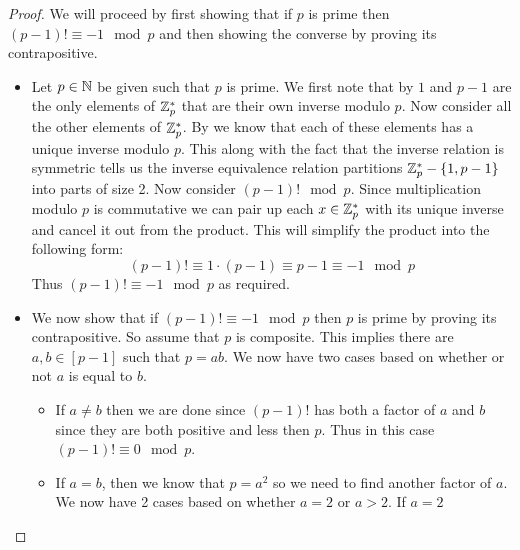         \begin{proof}
            We will proceed by first showing that if $p$ is prime then $(p - 1)! \equiv -1 \mod p$ and then
            showing the converse by proving its contrapositive.

            \begin{itemize}
                \item
                    Let $p \in \mathbb{N}$ be given such that $p$ is prime. 
                    We first note that by  $1$ and $p - 1$ are the
                    only elements of $\mathbb{Z}_{p}^{*}$ that are their own inverse modulo $p$. Now consider
                    all the other elements of $\mathbb{Z}_{p}^{*}$. By  we know
                    that each of these elements has a unique inverse modulo $p$. This along with the fact
                    that the inverse relation is symmetric tells us the inverse equivalence relation
                    partitions $\mathbb{Z}_{p}^{*} - \left\{1, p - 1\right\}$ into parts of size 2. Now consider
                    $(p - 1)! \mod p$. Since multiplication modulo $p$ is commutative we can pair up each
                    $x \in \mathbb{Z}_{p}^{*}$ with its unique inverse and cancel it out from the product. This
                    will simplify the product into the following form:
                    \[
                        (p - 1)! \equiv 1 \cdot (p - 1) \equiv p - 1 \equiv -1 \mod p
                    \]
                    Thus $(p - 1)! \equiv -1 \mod p$ as required.
                \item
                    We now show that if $(p - 1)! \equiv -1 \mod p$ then $p$ is prime by proving
                    its contrapositive. So assume that $p$ is composite. This implies there are
                    $a, b \in [p - 1]$ such that $p = ab$. We now have two cases based on whether
                    or not $a$ is equal to $b$.
                    \begin{itemize}
                        \item
                            If $a \neq b$ then we are done since $(p - 1)!$ has both a factor of $a$
                            and $b$ since they are both positive and less then $p$. Thus in this case
                            $(p - 1)! \equiv 0 \mod p$.
                        \item 
                            If $a = b$, then we know that $p = a^2$ so we need to find another factor
                            of $a$. We now have 2 cases based on whether $a = 2$ or $a > 2$. If $a = 2$

\end{itemize}
\end{itemize}
\end{proof}

